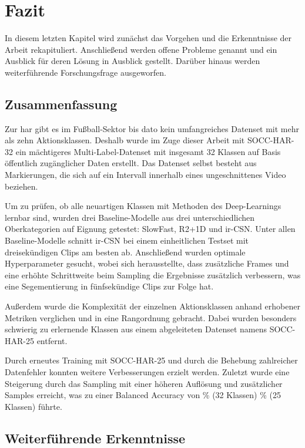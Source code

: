 \chapter{Fazit}
\label{ch:zusammenfassung}

In diesem letzten Kapitel wird zunächst das Vorgehen und die Erkenntnisse der Arbeit rekapituliert.
Anschließend werden offene Probleme genannt und ein Ausblick für deren Lösung in Ausblick gestellt.
Darüber hinaus werden weiterführende Forschungsfrage ausgeworfen.

\section{Zusammenfassung}
\label{sec:rekapitulation}

Zur \gls{har} gibt es im Fußball-Sektor bis dato kein umfangreiches Datenset mit mehr als zehn Aktionsklassen.
Deshalb wurde im Zuge dieser Arbeit mit SOCC-HAR-32 ein mächtigeres Multi-Label-Datenset mit insgesamt 32 Klassen auf Basis öffentlich zugänglicher Daten erstellt.
Das Datenset selbst besteht aus Markierungen, die sich auf ein Intervall innerhalb eines ungeschnittenes Video beziehen.

Um zu prüfen, ob alle neuartigen Klassen mit Methoden des Deep-Learnings lernbar sind, wurden drei Baseline-Modelle aus drei unterschiedlichen Oberkategorien auf Eignung getestet:
SlowFast, R2+1D und ir-CSN.
Unter allen Baseline-Modelle schnitt ir-CSN bei einem einheitlichen Testset mit dreisekündigen Clips am besten ab.
Anschließend wurden optimale Hyperparameter gesucht, wobei sich herausstellte, dass zusätzliche Frames und eine erhöhte Schrittweite beim Sampling die Ergebnisse zusätzlich verbessern, was eine Segementierung in fünfsekündige Clips zur Folge hat.

Außerdem wurde die Komplexität der einzelnen Aktionsklassen anhand erhobener Metriken verglichen und in eine Rangordnung gebracht.
Dabei wurden besonders schwierig zu erlernende Klassen aus einem abgeleiteten Datenset namens SOCC-HAR-25 entfernt.

Durch erneutes Training mit SOCC-HAR-25 und durch die Behebung zahlreicher Datenfehler konnten weitere Verbesserungen erzielt werden.
Zuletzt wurde eine Steigerung durch das Sampling mit einer höheren Auflösung und zusätzlicher Samples erreicht, was zu einer Balanced Accuracy von \primarymetric \% (32 Klassen) \bzw \secondarymetric \% (25 Klassen) führte.

\section{Weiterführende Erkenntnisse}
\label{sec:weiterfuhrende-erkenntnisse}

